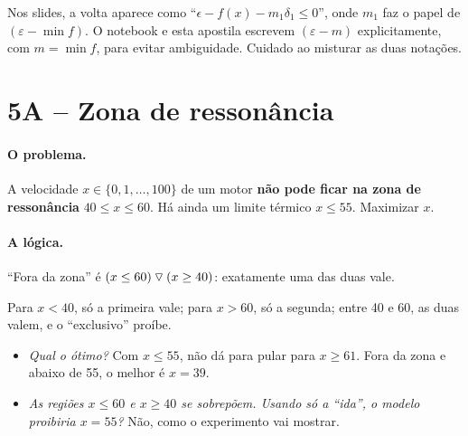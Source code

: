 \begin{atencao}
Nos slides, a volta aparece como ``$\epsilon - f(x) - m_1\delta_1\le0$'', onde $m_1$ faz o papel de
$(\varepsilon-\min f)$. O notebook e esta apostila escrevem $(\varepsilon-m)$ explicitamente, com $m=\min f$, para
evitar ambiguidade. Cuidado ao misturar as duas notações.
\end{atencao}

\section{5A -- Zona de ressonância}

\paragraph{O problema.} A velocidade $x\in\{0,1,\dots,100\}$ de um motor \textbf{não pode ficar na zona de
ressonância} $40\le x\le60$. Há ainda um limite térmico $x\le55$. Maximizar $x$.

\paragraph{A lógica.} ``Fora da zona'' é $(x\le60)\mathbin{\triangledown}(x\ge40)$: exatamente uma das duas vale.
\begin{center}
\end{center}
Para $x<40$, só a primeira vale; para $x>60$, só a segunda; entre 40 e 60, as duas valem, e o ``exclusivo'' proíbe.

\begin{discussao}
\begin{itemize}
  \item \emph{Qual o ótimo?} Com $x\le55$, não dá para pular para $x\ge61$. Fora da zona e abaixo de 55, o melhor é
  $x=39$.
  \item \emph{As regiões $x\le60$ e $x\ge40$ se sobrepõem. Usando só a ``ida'', o modelo proibiria $x=55$?} Não, como
  o experimento vai mostrar.
\end{itemize}
\end{discussao}

